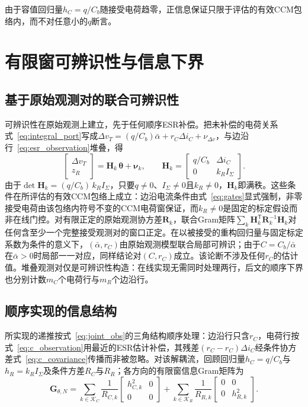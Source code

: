 \documentclass[zihao=5,a4paper]{ctexart}
\newcommand{\alphab}{\bar{\alpha}}
\newcommand{\vect}[1]{\bm{#1}}
\begin{document}
由于容值回归量$h_C=q/C_b$随接受电荷趋零，正信息保证只限于评估的有效CCM包络内，而不对任意小的$q$断言。


\section{有限窗可辨识性与信息下界}
\label{sec:identifiability}

\subsection{基于原始观测对的联合可辨识性}

可辨识性在原始观测上建立，先于任何顺序ESR补偿。把未补偿的电荷关系式~\eqref{eq:integral_port}写成$\Delta v_T=(q/C_b)\alphab+r_C\Delta i_C+\nu_{\Delta v}$，与边沿行~\eqref{eq:esr_observation}堆叠，得
\begin{equation}
\begin{bmatrix}\Delta v_T\\z_R\end{bmatrix}
=\vect{H}_k\,\vect{\theta}+\vect{\nu}_k,
\qquad
\vect{H}_k=
\begin{bmatrix}q/C_b&\Delta i_C\\0&k_RI_\Sigma\end{bmatrix}.
\label{eq:joint_obs}
\end{equation}
由于$\det\vect{H}_k=(q/C_b)\,k_RI_\Sigma$，只要$q\neq0$、$I_\Sigma\neq0$且$k_R\neq0$，$\vect{H}_k$即满秩。这些条件在所评估的有效CCM包络上成立：边沿电流条件由式~\eqref{eq:gates}显式强制，非零接受电荷由该包络内符号不变的CCM电荷窗保证，而$k_R\neq0$是固定的标定假设而非在线门控。对有限正定的原始观测协方差$\vect{R}_k$，联合Gram矩阵$\sum_k\vect{H}_k^{\mathsf T}\vect{R}_k^{-1}\vect{H}_k$对任何含至少一个完整接受观测对的窗口正定。在以被接受的重构回归量与固定标定系数为条件的意义下，$(\alphab,r_C)$由原始观测模型联合局部可辨识；由于$C=C_b/\alphab$在$\alphab>0$时局部一一对应，同样结论对$(C,r_C)$成立。该论断不涉及任何$r_C$的估计值。堆叠观测对仅是可辨识性构造：在线实现无需同时处理两行，后文的顺序下界也分别计数$m_C$个电荷行与$m_R$个边沿行。

\subsection{顺序实现的信息结构}

所实现的递推按式~\eqref{eq:joint_obs}的三角结构顺序处理：边沿行只含$r_C$，电荷行按式~\eqref{eq:c_observation}用最近的ESR估计补偿，其残差$(r_C-\hat r_C)\Delta i_C$经条件协方差式~\eqref{eq:c_covariance}传播而非被忽略。对该解耦流，回顾回归量$h_C=q/C_b$与$h_R=k_RI_\Sigma$及条件方差$R_C$与$R_R$；各方向的有限窗信息Gram矩阵为
\begin{equation}
\vect{G}_{\theta,N}=
\sum_{k\in\mathcal K_C}\frac{1}{R_{C,k}}
\begin{bmatrix}h_{C,k}^2&0\\0&0\end{bmatrix}
+
\sum_{k\in\mathcal K_R}\frac{1}{R_{R,k}}
\begin{bmatrix}0&0\\0&h_{R,k}^2\end{bmatrix}.
\label{eq:gramian}
\end{equation}
\end{document}
